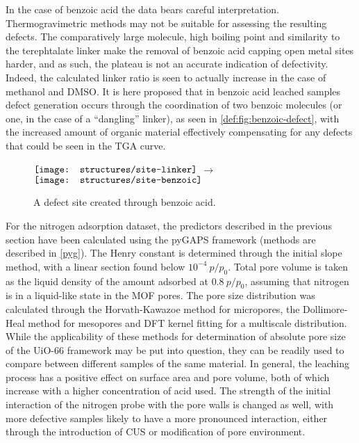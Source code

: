 In the case of benzoic acid the data bears careful interpretation. 
Thermogravimetric methods may not be suitable 
for assessing the resulting defects. The comparatively large molecule,
high boiling point and similarity to the terephtalate linker
make the removal of benzoic acid capping open metal sites harder, and
as such, the plateau is not an accurate indication of defectivity.
Indeed, the calculated linker ratio is seen to actually increase in 
the case of methanol and \gls{DMSO}. It is here proposed that in benzoic acid 
leached samples defect generation occurs through the coordination
of two benzoic molecules (or one, in the case of a ``dangling'' linker), 
as seen in \autoref{def:fig:benzoic-defect},
with the increased amount of organic material effectively compensating
for any defects that could be seen in the \gls{TGA} curve.

\begin{figure}[htb]
    \centering
    \( \vcenter{\hbox{\texttt{[image: structures/site-linker]}}}\)%
    \( \longrightarrow \)%
    \(\vcenter{\hbox{\texttt{[image: structures/site-benzoic]}}}\)
    \caption{A defect site created through benzoic acid.}%
    \label{def:fig:benzoic-defect}
\end{figure}

For the nitrogen adsorption dataset, the predictors described in the 
previous section have been calculated using the pyGAPS framework
(methods are described in \autoref{pyg}). The Henry constant is determined 
through the initial slope method, with a linear section found below 
\(10^{-4}~p/p_0\). Total pore volume is taken as the liquid density
of the amount adsorbed at \(0.8~p/p_0\), assuming that 
nitrogen is in a liquid-like state in the \gls{MOF} pores. The pore
size distribution was calculated through the Horvath-Kawazoe
method for micropores, the Dollimore-Heal method for mesopores
and \gls{DFT} kernel fitting for a multiscale distribution. While 
the applicability of these methods for determination of absolute
pore size of the UiO-66 framework may be put into question, 
they can be readily used to compare between different samples
of the same material.
In general, the leaching process has a positive effect on 
surface area and pore volume, both of which increase 
with a higher concentration of acid used. The strength of 
the initial interaction of the nitrogen probe with the pore 
walls is changed as well, with more defective samples likely
to have a more pronounced interaction, either through the introduction
of CUS or modification of pore environment.

